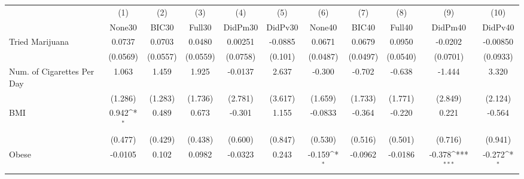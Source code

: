 {
\def\sym#1{\ifmmode^{#1}\else\(^{#1}\)\fi}
\begin{tabular}{l*{10}{c}}
\toprule
            &\multicolumn{1}{c}{(1)}&\multicolumn{1}{c}{(2)}&\multicolumn{1}{c}{(3)}&\multicolumn{1}{c}{(4)}&\multicolumn{1}{c}{(5)}&\multicolumn{1}{c}{(6)}&\multicolumn{1}{c}{(7)}&\multicolumn{1}{c}{(8)}&\multicolumn{1}{c}{(9)}&\multicolumn{1}{c}{(10)}\\
            &\multicolumn{1}{c}{None30}&\multicolumn{1}{c}{BIC30}&\multicolumn{1}{c}{Full30}&\multicolumn{1}{c}{DidPm30}&\multicolumn{1}{c}{DidPv30}&\multicolumn{1}{c}{None40}&\multicolumn{1}{c}{BIC40}&\multicolumn{1}{c}{Full40}&\multicolumn{1}{c}{DidPm40}&\multicolumn{1}{c}{DidPv40}\\
\midrule
Tried Marijuana&      0.0737         &      0.0703         &      0.0480         &     0.00251         &     -0.0885         &      0.0671         &      0.0679         &      0.0950         &     -0.0202         &    -0.00850         \\
            &    (0.0569)         &    (0.0557)         &    (0.0559)         &    (0.0758)         &     (0.101)         &    (0.0487)         &    (0.0497)         &    (0.0540)         &    (0.0701)         &    (0.0933)         \\
\addlinespace
Num. of Cigarettes Per Day&       1.063         &       1.459         &       1.925         &     -0.0137         &       2.637         &      -0.300         &      -0.702         &      -0.638         &      -1.444         &       3.320         \\
            &     (1.286)         &     (1.283)         &     (1.736)         &     (2.781)         &     (3.617)         &     (1.659)         &     (1.733)         &     (1.771)         &     (2.849)         &     (2.124)         \\
\addlinespace
BMI         &       0.942\sym{*}  &       0.489         &       0.673         &      -0.301         &       1.155         &     -0.0833         &      -0.364         &      -0.220         &       0.221         &      -0.564         \\
            &     (0.477)         &     (0.429)         &     (0.438)         &     (0.600)         &     (0.847)         &     (0.530)         &     (0.516)         &     (0.501)         &     (0.716)         &     (0.941)         \\
\addlinespace
Obese       &     -0.0105         &       0.102         &      0.0982         &     -0.0323         &       0.243         &      -0.159\sym{*}  &     -0.0962         &     -0.0186         &      -0.378\sym{***}&      -0.272\sym{*}  \\

\end{tabular}}
